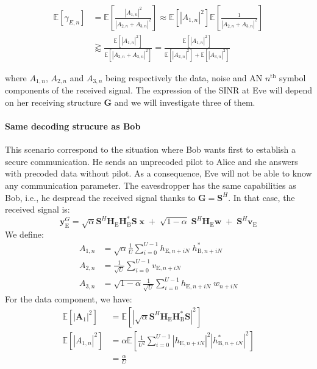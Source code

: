 \documentclass[journal,comsoc]{IEEEtran}
\newcommand{\module}[1]{\left|#1\right|}
\newcommand{\EX}[1]{\mathbb{E} \left[#1\right]}%
\newcommand{\HE}{\textbf{H}_{\text{E}}}
\newcommand{\HB}{\textbf{H}_{\text{B}}}
\newcommand{\ve}{\textbf{v}_{\text{E}}}
\newcommand{\spread}{\textbf{S}}
\newcommand{\w}{\textbf{w}}
\begin{document}
\begin{equation}
\begin{split}
\EX{\gamma_{E,n}} &= \EX{  \frac{ \left| A_{1,n} \right|^2  }{ \left| A_{2,n} + A_{3,n} \right|^2 } }  \approx  \EX{ \left| A_{1,n} \right|^2 }  \EX{ \frac{1}{ \left| A_{2,n} + A_{3,n} \right|^2} }  \\
& \gtrapprox \frac{\EX{   \left| A_{1,n} \right|^2  } }{\EX{ \left| A_{2,n} + A_{3,n} \right|^2  }} =  \frac{\EX{  \left| A_{1,n}\right|^2  } }{\EX{  \left| A_{2,n} \right|^2  } +  \EX{  \left|A_{3,n}\right|^2  }}
\label{eq:expected_sinr_eve}
\end{split}
\end{equation}

where $A_{1,n}$, $A_{2,n}$ and $A_{3,n}$ being respectively the data, noise and AN $n^{\text{th}}$ symbol components of the received signal. The expression of the SINR at Eve will depend on her receiving structure $\textbf{G}$ and we will investigate three of them.



\paragraph{Same decoding strucure as Bob}
This scenario correspond to the situation where Bob wants first to establish a secure communication. He sends an unprecoded pilot to Alice and she answers with precoded data without pilot. As a consequence, Eve will not be able to know any communication parameter.  The eavesdropper has the same capabilities as Bob, i.e., he despread the received signal thanks to $\textbf{G}=\spread^H$. In that case, the received signal is:
\begin{equation}
\textbf{y}_{\text{E}}^G = \sqrt{\alpha} \spread^H \HE \textbf{H}^*_{\text{B}} \spread\; \textbf{x} \; +  \; \sqrt{1-\alpha} \; \spread^H \HE \w  \; +  \; \spread^H  \ve 
\label{eq:rx_eve_filt0}
\end{equation}
We define:
\begin{equation}
\begin{split}
A_{1,n} &= \sqrt{\alpha}\frac{1}{U}\sum_{i=0}^{U-1}  h_{\text{E}, n + iN} \; h^*_{\text{B}, n + iN} \\
A_{2,n} &= \frac{1}{\sqrt{U}}\sum_{i=0}^{U-1}  v_{\text{E}, n + iN}\\
A_{3,n} &= \sqrt{1-\alpha}\frac{1}{\sqrt{U}}\sum_{i=0}^{U-1}  h_{\text{E}, n + iN} \; w_{n + iN}
\end{split}
\end{equation}
For the data component, we have:
\begin{equation}
	\begin{split}
	\EX{|\textbf{A}_{1}|^2} &= \EX{\module{\sqrt{\alpha}\spread^H \HE\HB^* \spread}^2} \\
	\EX{|A_{1,n}|^2}&=\alpha \EX{\frac{1}{U^2} \sum_{i=0}^{U-1} \left| h_{\text{E}, n + iN} \right|^2 \left| h^*_{\text{B}, n + iN}\right|^2 } \\
	&= \frac{\alpha}{U}
	\end{split}
	\label{eq:appA:data_eve_filt0}
\end{equation}
\end{document}
